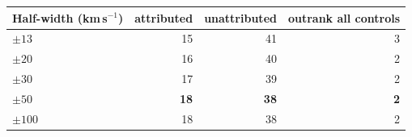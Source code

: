 \begin{tabular}{@{}lrrr@{}}
\hline
Half-width (km\,s$^{-1}$) & attributed & unattributed & outrank all controls \\
\hline
$\pm13$ & 15 & 41 & 3 \\
$\pm20$ & 16 & 40 & 2 \\
$\pm30$ & 17 & 39 & 2 \\
\textbf{$\pm50$} & \textbf{18} & \textbf{38} & \textbf{2} \\
$\pm100$ & 18 & 38 & 2 \\
\hline
\end{tabular}

